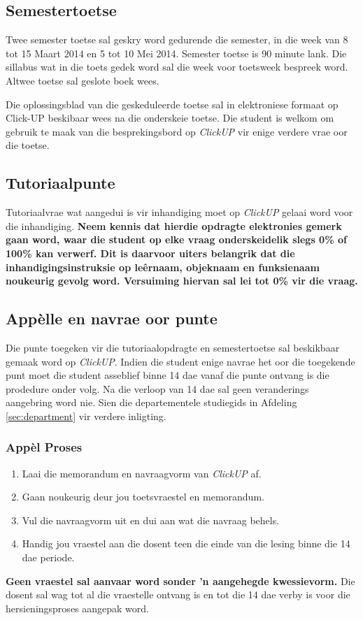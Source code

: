     \subsection{Semestertoetse}
    Twee semester toetse sal geskry word gedurende die semester, in
    die week van 8 tot 15 Maart 2014 en 5 tot 10 Mei 2014. Semester
    toetse is 90 minute lank.  Die sillabus wat in die toets gedek
    word sal die week voor toetsweek bespreek word.  Altwee toetse sal
    geslote boek wees.
        
    Die oplossingsblad van die geskeduleerde toetse sal in
    elektroniese formaat op Click-UP beskibaar wees na die onderskeie
    toetse. Die student is welkom om gebruik te maak van die
    besprekingsbord op \textit{ClickUP} vir enige verdere vrae oor die
    toetse.

    \subsection{Tutoriaalpunte}
    \label{sec:tutoriaal}

    Tutoriaalvrae wat aangedui is vir inhandiging moet op
    \textit{ClickUP} gelaai word voor die inhandiging. \textbf{Neem
      kennis dat hierdie opdragte elektronies gemerk gaan word, waar
      die student op elke vraag onderskeidelik slegs 0\% of 100\% kan
      verwerf. Dit is daarvoor uiters belangrik dat die
      inhandigingsinstruksie op le\^ernaam, objeknaam en funksienaam
      noukeurig gevolg word.  Versuiming hiervan sal lei tot 0\% vir
      die vraag.}


    \subsection{App\`{e}lle en navrae oor punte}
    Die punte toegeken vir die tutoriaalopdragte en semestertoetse sal
    beskikbaar gemaak word op \textit{ClickUP}. Indien die student
    enige navrae het oor die toegekende punt moet die student
    asseblief binne 14 dae vanaf die punte ontvang is die prodedure
    onder volg.  Na die verloop van 14 dae sal geen veranderings
    aangebring word nie. Sien die departementele studiegids in
    Afdeling \ref{sec:department} vir verdere inligting.

    \subsubsection{App\`{e}l Proses}
    \begin{enumerate}
                \item Laai die memorandum en navraagvorm van \textit{ClickUP} af.
                \item Gaan noukeurig deur jou toetsvraestel en memorandum.
                \item Vul die navraagvorm uit en dui aan wat die
                  navraag behels.
                \item Handig jou vraestel aan die dosent teen die
                  einde van die lesing binne die 14 dae periode.
            \end{enumerate}

            \textbf{Geen vraestel sal aanvaar word sonder 'n
              aangehegde kwessievorm.}  Die dosent sal wag tot al die
            vraestelle ontvang is en tot die 14 dae verby is voor die
            hersieningsproses aangepak word.

        


